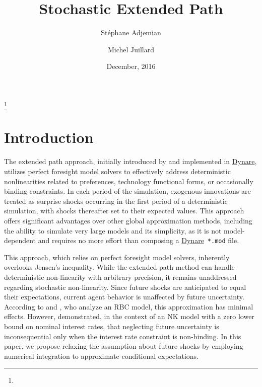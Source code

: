 \documentclass[a4paper,11pt]{amsart}
\newcommand{\Dynare}{\href{http://www.dynare.org}{Dynare}}
\begin{document}
\author[S. Adjemian]{Stéphane Adjemian}\address{Université du Mans and Dynare team}
\author[M. Juillard]{Michel Juillard}\address{Dynare team}


\title[Stochastic Extended Path]{Stochastic Extended Path}\thanks{}
\date{December, 2016}
\maketitle

\section*{Introduction}

The extended path approach, initially introduced by
\textcite{FairTaylor1983} and implemented in \Dynare, utilizes perfect
foresight model solvers to effectively address deterministic
nonlinearities related to preferences, technology functional forms, or
occasionally binding constraints. In each period of the simulation,
exogenous innovations are treated as surprise shocks occurring in the
first period of a deterministic simulation, with shocks thereafter set
to their expected values. This approach offers significant advantages
over other global approximation methods, including the ability to
simulate very large models and its simplicity, as it is not
model-dependent and requires no more effort than composing a \Dynare\,
\verb+*.mod+ file.\newline

This approach, which relies on perfect foresight model solvers,
inherently overlooks Jensen's inequality. While the extended path
method can handle deterministic non-linearity with arbitrary
precision, it remains unaddressed regarding stochastic
non-linearity. Since future shocks are anticipated to equal their
expectations, current agent behavior is unaffected by future
uncertainty. According to \textcite{Gagnon1990} and
\textcite{Love2009}, who analyze an RBC model, this approximation has
minimal effects. However, \textcite{AdjemianJuillard2011}
demonstrated, in the context of an NK model with a zero lower bound on
nominal interest rates, that neglecting future uncertainty is
inconsequential only when the interest rate constraint is
non-binding. In this paper, we propose relaxing the assumption about
future shocks by employing numerical integration to approximate
conditional expectations.\newline
\end{document}

